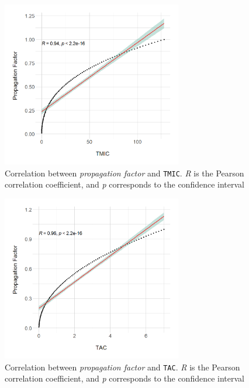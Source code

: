 \begin{figure}[ht!]
\begin{center}
\includegraphics[width=0.7\textwidth]{figures/results/Rplot_spoon-core_eclipse-osgi_TMIC.png}
\caption{Correlation between \textit{propagation factor} and \texttt{TMIC}. \textit{R} is the Pearson correlation coefficient, and \textit{p} corresponds to the confidence interval}
\label{fig:correlation-tmic}
\end{center}
\end{figure}

\begin{figure}[ht!]
\begin{center}
\includegraphics[width=0.7\textwidth]{figures/results/Rplot_spoon-core_eclipse-osgi_TAC.png}
\caption{Correlation between \textit{propagation factor} and \texttt{TAC}. \textit{R} is the Pearson correlation coefficient, and \textit{p} corresponds to the confidence interval}
\label{fig:correlation-tac}
\end{center}
\end{figure}

